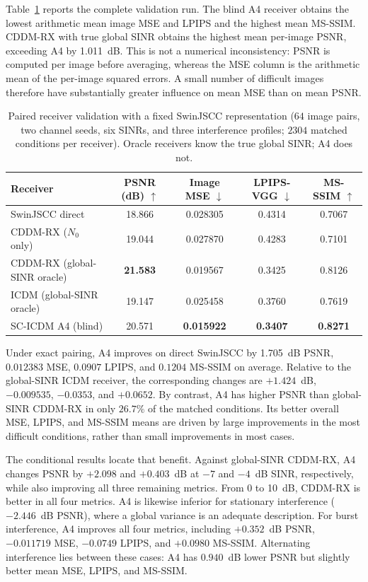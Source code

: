 Table~\ref{tab:published-baselines} reports the complete validation run.  The
blind A4 receiver obtains the lowest arithmetic mean image MSE and LPIPS and
the highest mean MS-SSIM.  CDDM-RX with true global SINR obtains the highest
mean per-image PSNR, exceeding A4 by 1.011~dB.  This is not a numerical
inconsistency: PSNR is computed per image before averaging, whereas the MSE
column is the arithmetic mean of the per-image squared errors.  A small number
of difficult images therefore have substantially greater influence on mean
MSE than on mean PSNR.

\begin{table}[t]
\centering
\caption{Paired receiver validation with a fixed SwinJSCC representation
($64$ image pairs, two channel seeds, six SINRs, and three interference
profiles; $2304$ matched conditions per receiver).  Oracle receivers know the
true global SINR; A4 does not.}
\label{tab:published-baselines}
\setlength{\tabcolsep}{7pt}
\begin{tabular}{lcccc}
\toprule
Receiver & PSNR (dB) $\uparrow$ & Image MSE $\downarrow$ & LPIPS-VGG $\downarrow$ & MS-SSIM $\uparrow$ \\
\midrule
SwinJSCC direct & 18.866 & 0.028305 & 0.4314 & 0.7067 \\
CDDM-RX ($N_0$ only) & 19.044 & 0.027870 & 0.4283 & 0.7101 \\
CDDM-RX (global-SINR oracle) & \textbf{21.583} & 0.019567 & 0.3425 & 0.8126 \\
ICDM (global-SINR oracle) & 19.147 & 0.025458 & 0.3760 & 0.7619 \\
SC-ICDM A4 (blind) & 20.571 & \textbf{0.015922} & \textbf{0.3407} & \textbf{0.8271} \\
\bottomrule
\end{tabular}
\end{table}

Under exact pairing, A4 improves on direct SwinJSCC by 1.705~dB PSNR,
$0.012383$ MSE, $0.0907$ LPIPS, and $0.1204$ MS-SSIM on average.  Relative to
the global-SINR ICDM receiver, the corresponding changes are $+1.424$~dB,
$-0.009535$, $-0.0353$, and $+0.0652$.  By contrast, A4 has higher PSNR than
global-SINR CDDM-RX in only $26.7\%$ of the matched conditions.  Its better
overall MSE, LPIPS, and MS-SSIM means are driven by large improvements in the
most difficult conditions, rather than small improvements in most cases.

The conditional results locate that benefit.  Against global-SINR CDDM-RX,
A4 changes PSNR by $+2.098$ and $+0.403$~dB at $-7$ and $-4$~dB SINR,
respectively, while also improving all three remaining metrics.  From 0 to
10~dB, CDDM-RX is better in all four metrics.  A4 is likewise inferior for
stationary interference ($-2.446$~dB PSNR), where a global variance is an
adequate description.  For burst interference, A4 improves all four metrics,
including $+0.352$~dB PSNR, $-0.011719$ MSE, $-0.0749$ LPIPS, and $+0.0980$
MS-SSIM.  Alternating interference lies between these cases: A4 has
$0.940$~dB lower PSNR but slightly better mean MSE, LPIPS, and MS-SSIM.

